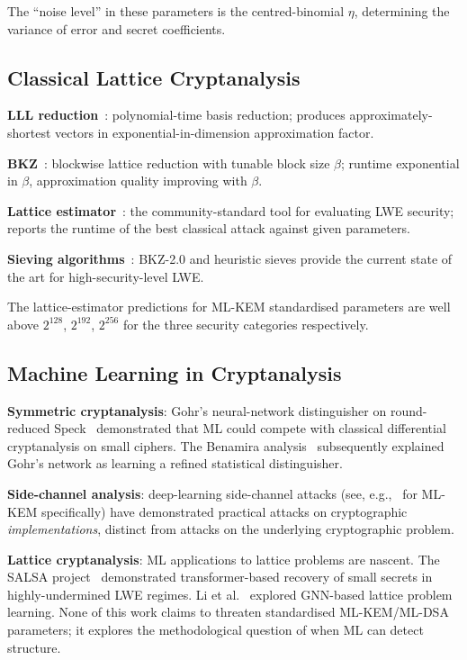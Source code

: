 \documentclass[sigconf,nonacm]{acmart}
\begin{document}
The ``noise level'' in these parameters is the centred-binomial
$\eta$, determining the variance of error and secret coefficients.

\subsection{Classical Lattice Cryptanalysis}

\textbf{LLL reduction}~\cite{lenstra1982lll}: polynomial-time basis
reduction; produces approximately-shortest vectors in
exponential-in-dimension approximation factor.

\textbf{BKZ}~\cite{schnorr1994lattice,chen2011bkz}: blockwise lattice
reduction with tunable block size $\beta$; runtime exponential in
$\beta$, approximation quality improving with $\beta$.

\textbf{Lattice estimator}~\cite{albrecht2018estimateall}: the
community-standard tool for evaluating LWE security; reports the
runtime of the best classical attack against given parameters.

\textbf{Sieving algorithms}~\cite{albrecht2019general}: BKZ-2.0 and
heuristic sieves provide the current state of the art for
high-security-level LWE.

The lattice-estimator predictions for ML-KEM standardised parameters
are well above $2^{128}$, $2^{192}$, $2^{256}$ for the three security
categories respectively.

\subsection{Machine Learning in Cryptanalysis}

\textbf{Symmetric cryptanalysis}: Gohr's neural-network distinguisher
on round-reduced Speck~\cite{gohr2019speck} demonstrated that ML
could compete with classical differential cryptanalysis on small
ciphers. The Benamira analysis~\cite{benamira2021gohr} subsequently
explained Gohr's network as learning a refined statistical
distinguisher.

\textbf{Side-channel analysis}: deep-learning side-channel attacks
(see, e.g.,~\cite{karayalcin2024kyber} for ML-KEM specifically)
have demonstrated practical attacks on cryptographic
\emph{implementations}, distinct from attacks on the underlying
cryptographic problem.

\textbf{Lattice cryptanalysis}: ML applications to lattice problems
are nascent. The SALSA project~\cite{wenger2024salsa} demonstrated
transformer-based recovery of small secrets in highly-undermined
LWE regimes. Li et al.~\cite{li2024lattice2024} explored GNN-based
lattice problem learning. None of this work claims to threaten
standardised ML-KEM/ML-DSA parameters; it explores the methodological
question of when ML can detect structure.
\end{document}
